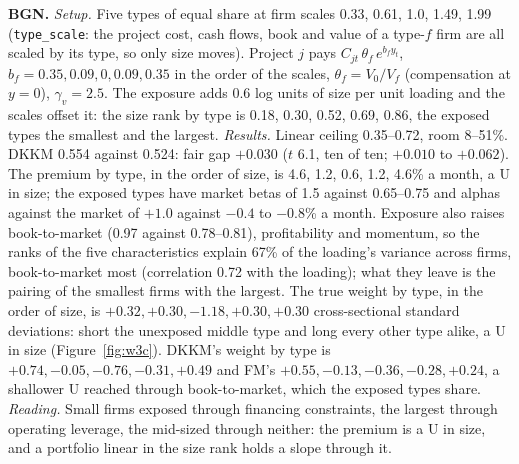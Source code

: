 \documentclass[11pt]{article}
\begin{document}
\noindent\textbf{BGN.} \emph{Setup.} Five types of equal share at firm scales 0.33, 0.61, 1.0, 1.49, 1.99 (\texttt{type\_scale}: the project cost, cash flows, book and value of a type-$f$ firm are all scaled by its type, so only size moves). Project $j$ pays $C_{jt}\,\theta_f\,e^{b_f y_t}$, $b_f = 0.35, 0.09, 0, 0.09, 0.35$ in the order of the scales, $\theta_f = V_0/V_f$ (compensation at $y = 0$), $\gamma_v = 2.5$. The exposure adds 0.6 log units of size per unit loading and the scales offset it: the size rank by type is 0.18, 0.30, 0.52, 0.69, 0.86, the exposed types the smallest and the largest. \emph{Results.} Linear ceiling 0.35--0.72, room 8--51\%. DKKM 0.554 against 0.524: fair gap $+0.030$ ($t$ 6.1, ten of ten; $+0.010$ to $+0.062$). The premium by type, in the order of size, is 4.6, 1.2, 0.6, 1.2, 4.6\% a month, a U in size; the exposed types have market betas of 1.5 against 0.65--0.75 and alphas against the market of $+1.0$ against $-0.4$ to $-0.8$\% a month. Exposure also raises book-to-market (0.97 against 0.78--0.81), profitability and momentum, so the ranks of the five characteristics explain 67\% of the loading's variance across firms, book-to-market most (correlation 0.72 with the loading); what they leave is the pairing of the smallest firms with the largest. The true weight by type, in the order of size, is $+0.32, +0.30, -1.18, +0.30, +0.30$ cross-sectional standard deviations: short the unexposed middle type and long every other type alike, a U in size (Figure~\ref{fig:w3c}). DKKM's weight by type is $+0.74, -0.05, -0.76, -0.31, +0.49$ and FM's $+0.55, -0.13, -0.36, -0.28, +0.24$, a shallower U reached through book-to-market, which the exposed types share. \emph{Reading.} Small firms exposed through financing constraints, the largest through operating leverage, the mid-sized through neither: the premium is a U in size, and a portfolio linear in the size rank holds a slope through it.
\end{document}
